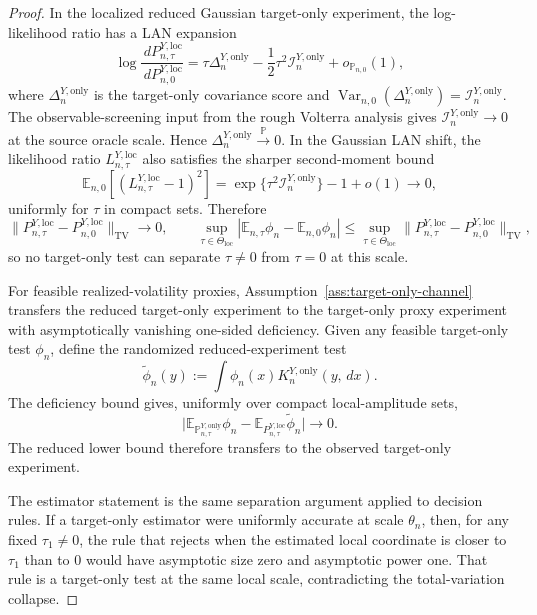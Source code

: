\documentclass[11pt,a4paper]{amsart}
\theoremstyle{plain}
\theoremstyle{definition}
\theoremstyle{remark}
\DeclareMathOperator{\Var}{Var}
\newcommand{\PP}{\mathbb{P}}
\newcommand{\EE}{\mathbb{E}}
\newcommand{\dd}{\,d}
\newcommand{\toP}{\xrightarrow{\PP}}
\begin{document}
\begin{proof}
In the localized reduced Gaussian target-only experiment, the log-likelihood ratio has a LAN
expansion
\[
        \log\frac{\dd P_{n,\tau}^{Y,\mathrm{loc}}}{\dd P_{n,0}^{Y,\mathrm{loc}}}
        =
        \tau\Delta_n^{Y,\mathrm{only}}
        -
        \frac12\tau^2\mathcal I_n^{Y,\mathrm{only}}
        +o_{\PP_{n,0}}(1),
\]
where \(\Delta_n^{Y,\mathrm{only}}\) is the target-only covariance score and
\(\Var_{n,0}(\Delta_n^{Y,\mathrm{only}})=\mathcal I_n^{Y,\mathrm{only}}\).  The observable-screening
input from the rough Volterra analysis gives
\(\mathcal I_n^{Y,\mathrm{only}}\to0\) at the source oracle scale.  Hence
\(\Delta_n^{Y,\mathrm{only}}\toP 0\).  In the Gaussian LAN shift, the likelihood ratio
\(L_{n,\tau}^{Y,\mathrm{loc}}\) also satisfies the sharper second-moment bound
\[
        \EE_{n,0}
        \left[
        \left(
        L_{n,\tau}^{Y,\mathrm{loc}}-1
        \right)^2
        \right]
        =
        \exp\{\tau^2\mathcal I_n^{Y,\mathrm{only}}\}-1+o(1)
        \to0,
\]
uniformly for \(\tau\) in compact sets.  Therefore
\[
        \|P_{n,\tau}^{Y,\mathrm{loc}}-P_{n,0}^{Y,\mathrm{loc}}\|_{\mathrm{TV}}\to0,
        \qquad
        \sup_{\tau\in\Theta_{\mathrm{loc}}}
        |\EE_{n,\tau}\phi_n-\EE_{n,0}\phi_n|
        \le
        \sup_{\tau\in\Theta_{\mathrm{loc}}}
        \|P_{n,\tau}^{Y,\mathrm{loc}}-P_{n,0}^{Y,\mathrm{loc}}\|_{\mathrm{TV}},
\]
so no target-only test can separate \(\tau\neq0\) from \(\tau=0\) at this scale.

For feasible realized-volatility proxies, Assumption~\ref{ass:target-only-channel} transfers the
reduced target-only experiment to the target-only proxy experiment with asymptotically vanishing
one-sided deficiency.  Given any feasible target-only test \(\phi_n\), define the randomized
reduced-experiment test
\[
        \widetilde\phi_n(y)
        :=
        \int \phi_n(x)K_n^{Y,\mathrm{only}}(y,\dd x).
\]
The deficiency bound gives, uniformly over compact local-amplitude sets,
\[
        \bigl|
        \EE_{\PP_{n,\tau}^{Y,\mathrm{only}}}\phi_n
        -
        \EE_{P_{n,\tau}^{Y,\mathrm{loc}}}\widetilde\phi_n
        \bigr|\to0 .
\]
The reduced lower bound therefore transfers to the observed target-only experiment.

The estimator statement is the same separation argument applied to decision rules.  If a target-only
estimator were uniformly accurate at scale \(\theta_n\), then, for any fixed \(\tau_1\neq0\), the
rule that rejects when the estimated local coordinate is closer to \(\tau_1\) than to \(0\) would
have asymptotic size zero and asymptotic power one.  That rule is a target-only test at the same
local scale, contradicting the total-variation collapse.
\end{proof}
\end{document}
